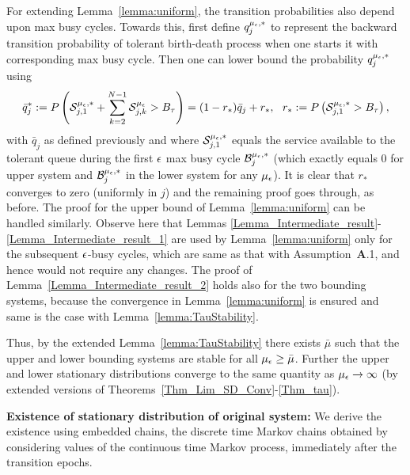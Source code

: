 {For extending Lemma~\ref{lemma:uniform}, the transition probabilities
also depend upon max busy cycles. Towards this, first define
$q_j^{{\mu_\epsilon}, *}$ to represent the backward transition probability of
tolerant birth-death process when one starts it with corresponding max
busy cycle.  Then one can lower bound the probability $q_j^{{\mu_\epsilon}, *}$
using
$$\bar{q}^*_j := P\left(\mathcal{S}_{j,1}^{{\mu_\epsilon},*} +\sum_{k = 2}^{N-1} \mathcal{S}_{j,k}^{{\mu_\epsilon}} > B_{{\tau}}\right) = (1-r_*) {\bar q}_j + r_*, \  \    r_* := P\left( \mathcal{S}_{j,1}^{{\mu_\epsilon},*}  > B_\tau\right),   $$  
with ${\bar q}_j$ as defined previously and where $\mathcal{S}_{j,1}^{{\mu_\epsilon},*} $
equals the service available to the tolerant queue during the first
${ \epsilon }$ max busy cycle $\mathcal{B}_{j}^{{\mu_\epsilon}, *}$ (which exactly equals 0 for
upper system and $\mathcal{B}_{j}^{{\mu_\epsilon}, *}$ in the lower system for any
${\mu_\epsilon}$). It is clear that $r_*$ converges to zero (uniformly in $j$)
and the remaining proof goes through, as before.  The proof for the
upper bound of Lemma~\ref{lemma:uniform} can be handled similarly.
Observe here that Lemmas
\ref{Lemma_Intermediate_result}-\ref{Lemma_Intermediate_result_1} are
used by Lemma~\ref{lemma:uniform} only for the subsequent ${ \epsilon }$-busy
cycles, which are same as that with Assumption~{\bf A}.1, and hence
would not require any changes.  The proof of
Lemma~\ref{Lemma_Intermediate_result_2} holds also for the two
bounding systems, because the convergence in Lemma~\ref{lemma:uniform}
is ensured and same is the case with Lemma~\ref{lemma:TauStability}.

Thus, by the extended Lemma~\ref{lemma:TauStability} there exists
${\bar \mu}$ such that the upper and lower bounding systems are stable
for all ${\mu_\epsilon} \ge {\bar \mu}$.  Further the upper and lower stationary
distributions converge to the same quantity as ${\mu_\epsilon} \to \infty$ (by
extended versions of Theorems~\ref{Thm_Lim_SD_Conv}-\ref{Thm_tau}).

{\bf Existence of stationary distribution of original system:} We
derive the existence using embedded chains, the discrete time Markov
chains obtained by considering values of the continuous time Markov
process, immediately after the transition epochs.

}
